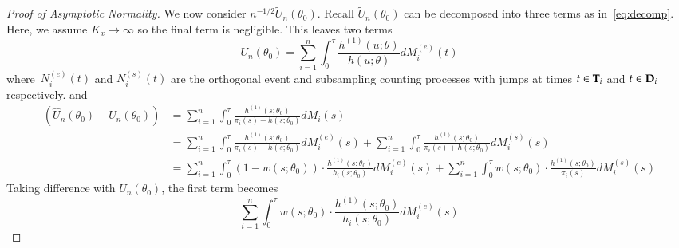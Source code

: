 \documentclass[12pt]{amsart}
\def\bfT{{\bf T}}
\def\bfD{{\bf D}}
\begin{document}
\begin{proof}[Proof of Asymptotic Normality]
We now consider $n^{-1/2} \tilde U_n (\theta_0 )$. Recall $\tilde U_n (\theta_0)$ can be decomposed into three terms as in~\eqref{eq:decomp}. Here, we assume $K_x \to \infty$ so the final term is negligible.  This leaves two terms
$$
U_n (\theta_0) = \sum_{i=1}^n \int_0^\tau \frac{h^{(1)}(u; \theta)}{h (u;\theta)} dM_i^{(e)} (t)
$$
where~$N_i^{(e)} (t)$ and $N_i^{(s)} (t)$ are the orthogonal event and subsampling counting processes with jumps at times $t \in \bfT_i$ and $t \in \bfD_i$ respectively.
and
\begin{align*}
(\hat U_n (\theta_0) - U_n (\theta_0) )
&= \sum_{i=1}^n \int_0^\tau \frac{h^{(1)}(s; \theta_0)}{\pi_i (s) + h(s; \theta_0)} dM_i (s) \\
&= \sum_{i=1}^n \int_0^\tau \frac{h^{(1)}(s; \theta_0)}{\pi_i (s) + h(s; \theta_0)} dM^{(e)}_i (s) +
\sum_{i=1}^n \int_0^\tau \frac{h^{(1)}(s; \theta_0)}{\pi_i (s) + h(s; \theta_0)} dM_i^{(s)} (s) \\
&= \sum_{i=1}^n \int_0^\tau (1-w(s;\theta_0)) \cdot \frac{h^{(1)}(s; \theta_0)}{h_i (s;\theta_0)} dM_i^{(e)} (s) +
\sum_{i=1}^n \int_0^\tau w(s;\theta_0) \cdot \frac{h^{(1)}(s; \theta_0)}{\pi_i (s)} dM_i^{(s)} (s)
\end{align*}
Taking difference with $U_n(\theta_0)$, the first term becomes
\[
\sum_{i=1}^n \int_0^\tau w(s;\theta_0) \cdot \frac{h^{(1)}(s; \theta_0)}{h_i (s;\theta_0)} dM_i^{(e)} (s)
\]


\end{proof}
\end{document}
